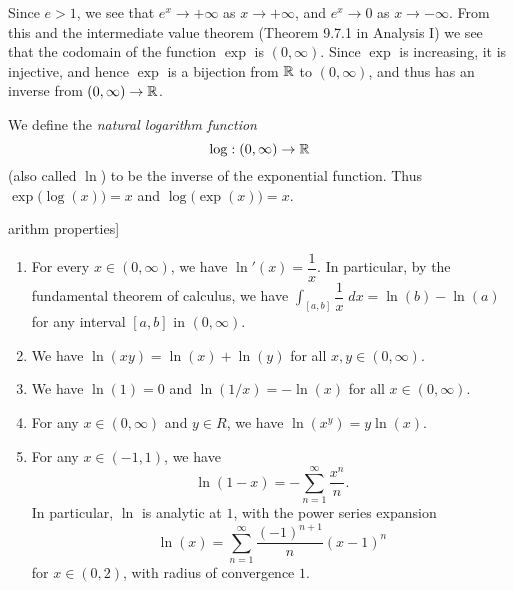 \begin{note}
  Since \(e > 1\), we see that \(e^x \to +\infty\) as \(x \to +\infty\), and \(e^x \to 0\) as \(x \to -\infty\).
  From this and the intermediate value theorem (Theorem 9.7.1 in Analysis I) we see that the codomain of the function \(\exp\) is \((0, \infty)\).
  Since \(\exp\) is increasing, it is injective, and hence \(\exp\) is a bijection from \(\mathbb{R}\) to \((0, \infty)\), and thus has an inverse from \((0, \infty) \to \mathbb{R}\).
\end{note}

\begin{defn}[Logarithm]\label{ii:4.5.5}
  We define the \emph{natural logarithm function}
  \[
    \log : (0, \infty) \to \mathbb{R}
  \]
  (also called \(\ln\)) to be the inverse of the exponential function.
  Thus \(\exp\big(\log(x)\big) = x\) and \(\log\big(\exp(x)\big) = x\).
\end{defn}

\begin{thm}arithm properties]\label{ii:4.5.6}
  \quad
  \begin{enumerate}
    \item For every \(x \in (0, \infty)\), we have \(\ln'(x) = \dfrac{1}{x}\).
          In particular, by the fundamental theorem of calculus, we have \(\int_{[a, b]} \dfrac{1}{x} \; dx = \ln(b) - \ln(a)\) for any interval \([a, b]\) in \((0, \infty)\).
    \item We have \(\ln(xy) = \ln(x) + \ln(y)\) for all \(x, y \in (0, \infty)\).
    \item We have \(\ln(1) = 0\) and \(\ln(1 / x) = -\ln(x)\) for all \(x \in (0, \infty)\).
    \item For any \(x \in (0, \infty)\) and \(y \in R\), we have \(\ln(x^y) = y \ln(x)\).
    \item For any \(x \in (-1, 1)\), we have
          \[
            \ln(1 - x) = - \sum_{n = 1}^\infty \dfrac{x^n}{n}.
          \]
          In particular, \(\ln\) is analytic at \(1\), with the power series expansion
          \[
            \ln(x) = \sum_{n = 1}^\infty \dfrac{(-1)^{n + 1}}{n} (x - 1)^n
          \]
          for \(x \in (0, 2)\), with radius of convergence \(1\).
  \end{enumerate}
\end{thm}

